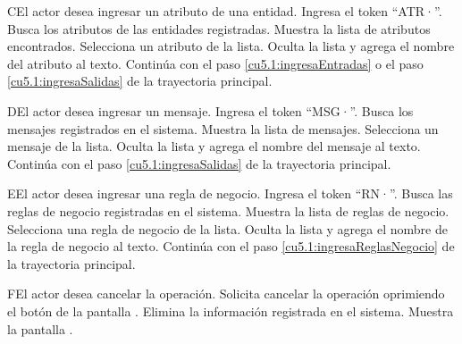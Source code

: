  \begin{UCtrayectoriaA}{C}{El actor desea ingresar un atributo de una entidad.}
 	\UCpaso[\UCactor] Ingresa el token ``ATR·''.
  	\UCpaso[\UCsist] Busca los atributos de las entidades registradas.
  	\UCpaso[\UCsist] Muestra la lista de atributos encontrados.
 	\UCpaso[\UCactor] Selecciona un atributo de la lista.
  	\UCpaso[\UCsist] Oculta la lista y agrega el nombre del atributo al texto.
    \UCpaso[] Continúa con el paso \ref{cu5.1:ingresaEntradas} o el paso \ref{cu5.1:ingresaSalidas} de la trayectoria principal.
 \end{UCtrayectoriaA}
 \begin{UCtrayectoriaA}{D}{El actor desea ingresar un mensaje.}
 	 \UCpaso[\UCactor] Ingresa el token ``MSG·''.	
 	\UCpaso[\UCsist] Busca los mensajes registrados en el sistema. 
 	\UCpaso[\UCsist] Muestra la lista de mensajes.
 	\UCpaso[\UCactor] Selecciona un mensaje de la lista.
  	\UCpaso[\UCsist] Oculta la lista y agrega el nombre del mensaje al texto.
    \UCpaso[] Continúa con el paso \ref{cu5.1:ingresaSalidas} de la trayectoria principal.
 \end{UCtrayectoriaA}
 \begin{UCtrayectoriaA}{E}{El actor desea ingresar una regla de negocio.}
 	\UCpaso[\UCactor] Ingresa el token ``RN·''.	
 	\UCpaso[\UCsist] Busca las reglas de negocio registradas en el sistema. 
 	\UCpaso[\UCsist] Muestra la lista de reglas de negocio.
 	\UCpaso[\UCactor] Selecciona una regla de negocio de la lista.
  	\UCpaso[\UCsist] Oculta la lista y agrega el nombre de la regla de negocio al texto.
    \UCpaso[] Continúa con el paso \ref{cu5.1:ingresaReglasNegocio} de la trayectoria principal.
 \end{UCtrayectoriaA}
 \begin{UCtrayectoriaA}{F}{El actor desea cancelar la operación.}
    \UCpaso[\UCactor] Solicita cancelar la operación oprimiendo el botón  de la pantalla .
    \UCpaso[\UCsist] Elimina la información registrada en el sistema.
    \UCpaso[\UCsist] Muestra la pantalla .
 \end{UCtrayectoriaA}
